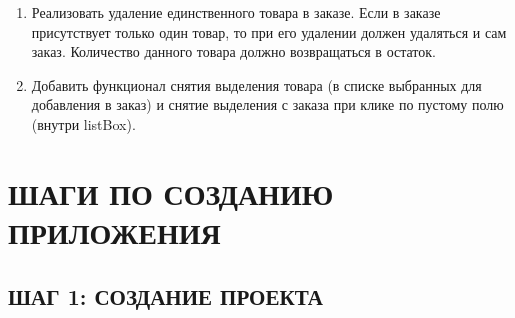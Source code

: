 \documentclass[12pt]{article}
\renewcommand{\texttt}[1]{{\small\ttfamily #1}}
\begin{document}
\begin{enumerate}
	\item[\faTrash] Реализовать удаление единственного товара в заказе. Если в заказе присутствует только один товар, то при его удалении должен удаляться и сам заказ. Количество данного товара должно возвращаться в остаток.

	\item[\faBroom] Добавить функционал снятия выделения товара (в списке выбранных для добавления в заказ) и снятие выделения с заказа при клике по пустому полю (внутри \texttt{listBox}).

\end{enumerate}


\newpage

\section{ШАГИ ПО СОЗДАНИЮ ПРИЛОЖЕНИЯ ~\texorpdfstring{\faRoute}{}}

\subsection{ШАГ 1: СОЗДАНИЕ ПРОЕКТА}
\end{document}
